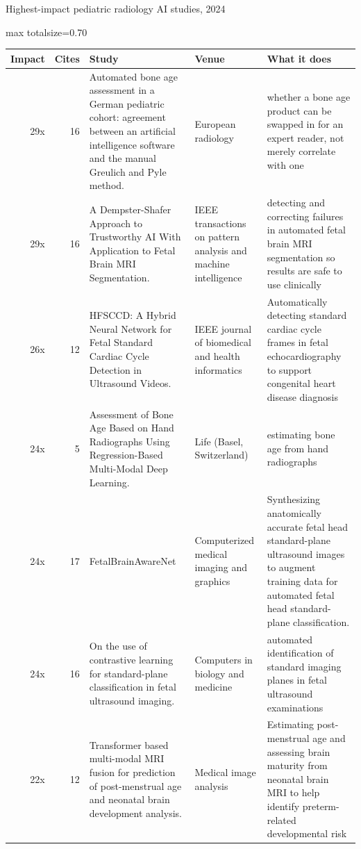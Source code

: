 \documentclass[aspectratio=169]{beamer}
\renewcommand{\arraystretch}{1.08}
\begin{document}
\begin{frame}[category=Journals/Preprints]{Highest-impact pediatric radiology AI studies, 2024}
\tiny
\begin{adjustbox}{max totalsize={\textwidth}{0.70\textheight}}
\renewcommand{\arraystretch}{1.2}
\begin{tabular}{|r|r|>{\raggedright\arraybackslash}p{}|>{\raggedright\arraybackslash}p{}|>{\raggedright\arraybackslash}p{}|}
\hline \textbf{Impact} & \textbf{Cites} & \textbf{Study} & \textbf{Venue} & \textbf{What it does} \\ \hline
29x & 16 & Automated bone age assessment in a German pediatric cohort: agreement between an artificial intelligence software and the manual Greulich and Pyle method. & European radiology & whether a bone age product can be swapped in for an expert reader, not merely correlate with one \\ \hline
29x & 16 & A Dempster-Shafer Approach to Trustworthy AI With Application to Fetal Brain MRI Segmentation. & IEEE transactions on pattern analysis and machine intelligence & detecting and correcting failures in automated fetal brain MRI segmentation so results are safe to use clinically \\ \hline
26x & 12 & HFSCCD: A Hybrid Neural Network for Fetal Standard Cardiac Cycle Detection in Ultrasound Videos. & IEEE journal of biomedical and health informatics & Automatically detecting standard cardiac cycle frames in fetal echocardiography to support congenital heart disease diagnosis \\ \hline
24x & 5 & Assessment of Bone Age Based on Hand Radiographs Using Regression-Based Multi-Modal Deep Learning. & Life (Basel, Switzerland) & estimating bone age from hand radiographs \\ \hline
24x & 17 & FetalBrainAwareNet & Computerized medical imaging and graphics & Synthesizing anatomically accurate fetal head standard-plane ultrasound images to augment training data for automated fetal head standard-plane classification. \\ \hline
24x & 16 & On the use of contrastive learning for standard-plane classification in fetal ultrasound imaging. & Computers in biology and medicine & automated identification of standard imaging planes in fetal ultrasound examinations \\ \hline
22x & 12 & Transformer based multi-modal MRI fusion for prediction of post-menstrual age and neonatal brain development analysis. & Medical image analysis & Estimating post-menstrual age and assessing brain maturity from neonatal brain MRI to help identify preterm-related developmental risk \\ \hline

\end{tabular}
\end{adjustbox}
\end{frame}
\end{document}
